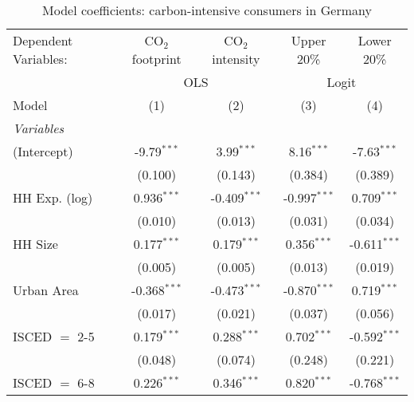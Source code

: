 
\begin{table}[htbp!]
   \centering
   \small
   \begin{adjustbox}{width = 1\textwidth, max height = 0.95\textheight, center}
      \begin{threeparttable}[b]
         \caption{\label{tab:Logit_1_DEU} Model coefficients: carbon-intensive consumers in Germany}
         \begin{tabular}{lcccc}
            \tabularnewline \midrule \midrule
            Dependent Variables: & CO$_{2}$ footprint & CO$_{2}$ intensity & Upper 20\%     & Lower 20\%\\   
             & \multicolumn{2}{c}{OLS} & \multicolumn{2}{c}{Logit} \\ 
            Model                & (1)                & (2)                & (3)            & (4)\\  
            \midrule
            \emph{Variables}\\
            (Intercept)          & -9.79$^{***}$      & 3.99$^{***}$       & 8.16$^{***}$   & -7.63$^{***}$\\   
                                 & (0.100)            & (0.143)            & (0.384)        & (0.389)\\   
            HH Exp. (log)        & 0.936$^{***}$      & -0.409$^{***}$     & -0.997$^{***}$ & 0.709$^{***}$\\   
                                 & (0.010)            & (0.013)            & (0.031)        & (0.034)\\   
            HH Size              & 0.177$^{***}$      & 0.179$^{***}$      & 0.356$^{***}$  & -0.611$^{***}$\\   
                                 & (0.005)            & (0.005)            & (0.013)        & (0.019)\\   
            Urban Area           & -0.368$^{***}$     & -0.473$^{***}$     & -0.870$^{***}$ & 0.719$^{***}$\\   
                                 & (0.017)            & (0.021)            & (0.037)        & (0.056)\\   
            ISCED $=$ 2-5        & 0.179$^{***}$      & 0.288$^{***}$      & 0.702$^{***}$  & -0.592$^{***}$\\   
                                 & (0.048)            & (0.074)            & (0.248)        & (0.221)\\   
            ISCED $=$ 6-8        & 0.226$^{***}$      & 0.346$^{***}$      & 0.820$^{***}$  & -0.768$^{***}$\\   

\end{tabular}
\end{threeparttable}
\end{adjustbox}
\end{table}
